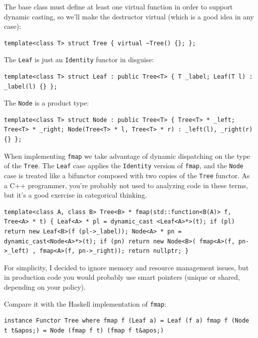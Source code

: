The base class must define at least one virtual function in order to
support dynamic casting, so we'll make the destructor virtual (which is
a good idea in any case):

\begin{verbatim}
template<class T> struct Tree { virtual ~Tree() {}; };
\end{verbatim}

The \texttt{Leaf} is just an \texttt{Identity} functor in disguise:

\begin{verbatim}
template<class T> struct Leaf : public Tree<T> { T _label; Leaf(T l) : _label(l) {} };
\end{verbatim}

The \texttt{Node} is a product type:

\begin{verbatim}
template<class T> struct Node : public Tree<T> { Tree<T> * _left; Tree<T> * _right; Node(Tree<T> * l, Tree<T> * r) : _left(l), _right(r) {} };
\end{verbatim}

When implementing \texttt{fmap} we take advantage of dynamic dispatching
on the type of the \texttt{Tree}. The \texttt{Leaf} case applies the
\texttt{Identity} version of \texttt{fmap}, and the \texttt{Node} case
is treated like a bifunctor composed with two copies of the
\texttt{Tree} functor. As a C++ programmer, you're probably not used to
analyzing code in these terms, but it's a good exercise in categorical
thinking.

\begin{verbatim}
template<class A, class B> Tree<B> * fmap(std::function<B(A)> f, Tree<A> * t) { Leaf<A> * pl = dynamic_cast <Leaf<A>*>(t); if (pl) return new Leaf<B>(f (pl->_label)); Node<A> * pn = dynamic_cast<Node<A>*>(t); if (pn) return new Node<B>( fmap<A>(f, pn->_left) , fmap<A>(f, pn->_right)); return nullptr; }
\end{verbatim}

For simplicity, I decided to ignore memory and resource management
issues, but in production code you would probably use smart pointers
(unique or shared, depending on your policy).

Compare it with the Haskell implementation of \texttt{fmap}:

\begin{verbatim}
instance Functor Tree where fmap f (Leaf a) = Leaf (f a) fmap f (Node t t&apos;) = Node (fmap f t) (fmap f t&apos;)
\end{verbatim}

